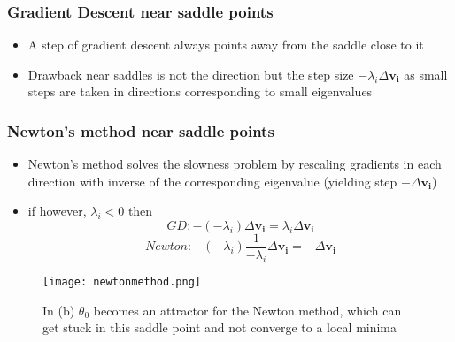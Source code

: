 \documentclass{beamer}
\begin{document}
\begin{frame}
\frametitle{Gradient Descent near saddle points}
\pause
\begin{itemize}
\item{A step of gradient descent always points away from the saddle close to it}
\pause
\item{Drawback near saddles is not the direction but the step size $-\lambda_i \Delta \bm{v_i}$ as small steps are taken in directions corresponding to small eigenvalues}
\pause
\end{itemize}

\vspace{-0.2in}
\begin{figure}
  \centering
  \hspace{0.02in}
\end{figure}

\end{frame}

\begin{frame}
\frametitle{Newton's method near saddle points}
\pause
\begin{itemize}
\item{Newton's method solves the slowness problem by rescaling gradients in each direction with inverse of the corresponding eigenvalue (yielding step $-\Delta \bm{v_i}$)}
\pause
\vspace{0.04in}
\item{if however, $\lambda_i < 0$ then $$ GD: - (-\lambda_i)\Delta \bm{v_i} = \lambda_i \Delta \bm{v_i}$$ $$Newton: - (-\lambda_i)\frac{1}{-\lambda_{i}}\Delta\bm{v_i} = -\Delta\bm{v_i} $$}
\pause   
\end{itemize}

\vspace{-0.44in}
\begin{figure}
\centering
\texttt{[image: newtonmethod.png]}
\vspace{-0.15in}
\caption{In (b) $\theta_0$ becomes an attractor for the Newton method, which can get stuck in this saddle point and not converge to a local minima}
\end{figure}

\end{frame}
\end{document}
